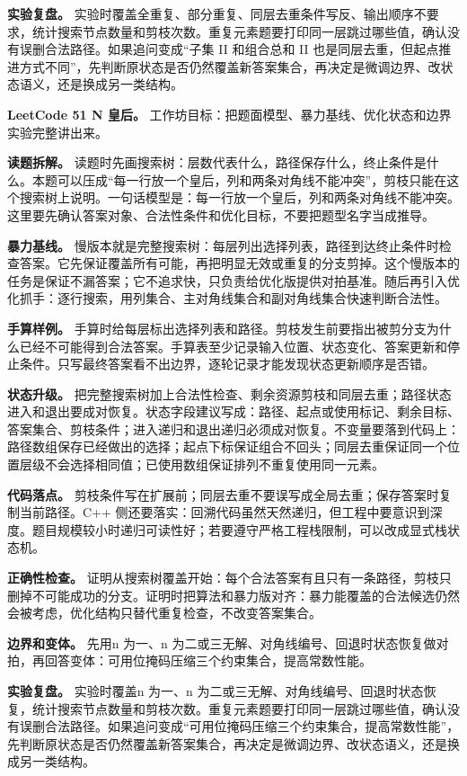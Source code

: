 \textbf{实验复盘。} 实验时覆盖全重复、部分重复、同层去重条件写反、输出顺序不要求，统计搜索节点数量和剪枝次数。重复元素题要打印同一层跳过哪些值，确认没有误删合法路径。如果追问变成“子集 II 和组合总和 II 也是同层去重，但起点推进方式不同”，先判断原状态是否仍然覆盖新答案集合，再决定是微调边界、改状态语义，还是换成另一类结构。

\noindent\textbf{LeetCode 51 N 皇后。} 工作坊目标：把题面模型、暴力基线、优化状态和边界实验完整讲出来。

\textbf{读题拆解。} 读题时先画搜索树：层数代表什么，路径保存什么，终止条件是什么。本题可以压成“每一行放一个皇后，列和两条对角线不能冲突”，剪枝只能在这个搜索树上说明。一句话模型是：每一行放一个皇后，列和两条对角线不能冲突。这里要先确认答案对象、合法性条件和优化目标，不要把题型名字当成推导。

\textbf{暴力基线。} 慢版本就是完整搜索树：每层列出选择列表，路径到达终止条件时检查答案。它先保证覆盖所有可能，再把明显无效或重复的分支剪掉。这个慢版本的任务是保证不漏答案；它不追求快，只负责给优化版提供对拍基准。随后再引入优化抓手：逐行搜索，用列集合、主对角线集合和副对角线集合快速判断合法性。

\textbf{手算样例。} 手算时给每层标出选择列表和路径。剪枝发生前要指出被剪分支为什么已经不可能得到合法答案。手算表至少记录输入位置、状态变化、答案更新和停止条件。只写最终答案看不出边界，逐轮记录才能发现状态更新顺序是否错。

\textbf{状态升级。} 把完整搜索树加上合法性检查、剩余资源剪枝和同层去重；路径状态进入和退出要成对恢复。状态字段建议写成：路径、起点或使用标记、剩余目标、答案集合、剪枝条件；进入递归和退出递归必须成对恢复。不变量要落到代码上：路径数组保存已经做出的选择；起点下标保证组合不回头；同层去重保证同一个位置层级不会选择相同值；已使用数组保证排列不重复使用同一元素。

\textbf{代码落点。} 剪枝条件写在扩展前；同层去重不要误写成全局去重；保存答案时复制当前路径。C++ 侧还要落实：回溯代码虽然天然递归，但工程中要意识到深度。题目规模较小时递归可读性好；若要遵守严格工程栈限制，可以改成显式栈状态机。

\textbf{正确性检查。} 证明从搜索树覆盖开始：每个合法答案有且只有一条路径，剪枝只删掉不可能成功的分支。证明时把算法和暴力版对齐：暴力能覆盖的合法候选仍然会被考虑，优化结构只替代重复检查，不改变答案集合。

\textbf{边界和变体。} 先用n 为一、n 为二或三无解、对角线编号、回退时状态恢复做对拍，再回答变体：可用位掩码压缩三个约束集合，提高常数性能。

\textbf{实验复盘。} 实验时覆盖n 为一、n 为二或三无解、对角线编号、回退时状态恢复，统计搜索节点数量和剪枝次数。重复元素题要打印同一层跳过哪些值，确认没有误删合法路径。如果追问变成“可用位掩码压缩三个约束集合，提高常数性能”，先判断原状态是否仍然覆盖新答案集合，再决定是微调边界、改状态语义，还是换成另一类结构。

